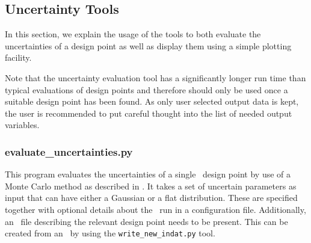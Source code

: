 \subsection{Uncertainty Tools}

In this section, we explain the usage of the \process\/ tools to both evaluate
the uncertainties of a design point as well as display them using a simple
plotting facility.

Note that the uncertainty evaluation tool has a significantly longer run time
than typical evaluations of \process\/ design points and therefore should only
be used once a suitable design point has been found.  As only user selected
output data is kept, the user is recommended to put careful thought into the
list of needed output variables.

\subsubsection{evaluate\_uncertainties.py}
This program evaluates the uncertainties of a single \process\ design point by
use of a Monte Carlo method as described in \cite{WPPMI2014Report}. It takes a
set of uncertain parameters as input that can have either a Gaussian or a flat
distribution. These are specified together with optional details about the
\process\ run in a configuration file. Additionally, an \indat\ file
describing the relevant design point needs to be present. This can be created
from an \mfile\ by using the \texttt{write\_new\_indat.py} tool.

